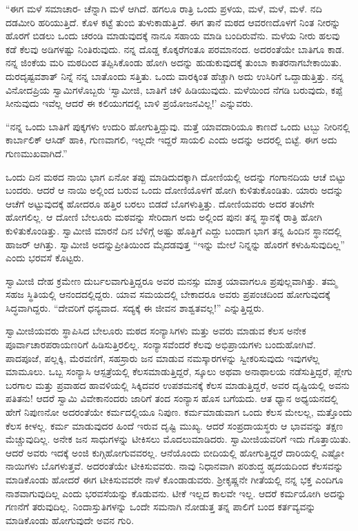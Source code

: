 \vskip 2pt

 “ಈಗ ಮಳೆ ಸಮಾಚಾರ- ಚೆನ್ನಾಗಿ ಮಳೆ ಆಗಿದೆ. ಹಗಲೂ ರಾತ್ರಿ ಒಂದು ಪ್ರಳಯ, ಮಳೆ, ಮಳೆ, ಮಳೆ. ನದಿ ದಡಮೀರಿ ಹರಿಯುತ್ತಿದೆ. ಕೊಳ ಕಟ್ಟೆ ತುಂಬಿ ತುಳುಕಾಡುತ್ತಿದೆ. ಈಗ ತಾನೆ ಮಠದ ಆವರಣದೊಳಗೆ ನಿಂತ ನೀರನ್ನು ಹೊರಗೆ ಬಿಡಲು ಒಂದು ಚರಂಡಿ ಮಾಡುವುದಕ್ಕೆ ನಾನೂ ಸಹಾಯ ಮಾಡಿ ಬಂದಿರುವೆನು. ಮಳೆಯ ನೀರು ಹಲವು ಕಡೆ ಕೆಲವು ಅಡಿಗಳಷ್ಟು ನಿಂತಿರುವುದು. ನನ್ನ ದೊಡ್ಡ ಕೊಕ್ಕರೆಗಂತೂ ಪರಮಾನಂದ. ಅದರಂತೆಯೇ ಬಾತಿಗೂ ಕಾಡ. ನನ್ನ ಜಿಂಕೆಯ ಮರಿ ಮಠದಿಂದ ತಪ್ಪಿಸಿಕೊಂಡು ಹೋಗಿ ಅದನ್ನು ಹುಡುಕುವುದಕ್ಕೆ ತುಂಬಾ ಕಾತರನಾಗಬೇಕಾಯಿತು. ದುರದೃಷ್ಟವಶಾತ್ ನಿನ್ನೆ ನನ್ನ ಬಾತೊಂದು ಸತ್ತಿತು. ಒಂದು ವಾರಕ್ಕಿಂತ ಹೆಚ್ಚಾಗಿ ಅದು ಉಸಿರಿಗೆ ಒದ್ದಾಡುತ್ತಿತ್ತು. ನನ್ನ ವಿನೋದಪ್ರಿಯ ಸ್ವಾಮಿಗಳೊಬ್ಬರು ‘ಸ್ವಾಮೀಜಿ, ಬಾತಿಗೆ ಚಳಿ ಹಿಡಿಯುವುದು. ಮಳೆಯಿಂದ ನೆಗಡಿ ಬರುವುದು, ಕಪ್ಪೆ ಸೀನುವುದು ಇವೆಲ್ಲ ಆದರೆ ಈ ಕಲಿಯುಗದಲ್ಲಿ ಬಾಳಿ ಪ್ರಯೋಜನವಿಲ್ಲ!’ ಎನ್ನುವರು.

 “ನನ್ನ ಒಂದು ಬಾತಿಗೆ ಪುಕ್ಕಗಳು ಉದುರಿ ಹೋಗುತ್ತಿದ್ದುವು. ಮತ್ತೆ ಯಾವದಾರಿಯೂ ಕಾಣದೆ ಒಂದು ಟಬ್ಬು ನೀರಿನಲ್ಲಿ ಕಾರ್ಬಾಲಿಕ್ ಆಸಿಡ್ ಹಾಕಿ, ಗುಣವಾಗಲಿ, ಇಲ್ಲದೇ ಇದ್ದರೆ ಸಾಯಲಿ ಎಂದು ಅದನ್ನು ಅದರಲ್ಲಿ ಬಿಟ್ಟೆ. ಈಗ ಅದು ಗುಣಮುಖವಾಗಿದೆ.”

 ಒಂದು ದಿನ ಮಠದ ನಾಯಿ ಭಾಗ ಏನೋ ತಪ್ಪು ಮಾಡಿದುದಕ್ಕಾಗಿ ದೋಣಿಯಲ್ಲಿ ಅದನ್ನು ಗಂಗಾನದಿಯ ಆಚೆ ಬಿಟ್ಟು ಬಂದರು. ಆದರೆ ಆ ನಾಯಿ ಅಲ್ಲಿಂದ ಬರುವ ಒಂದು ದೋಣಿಯೊಳಗೆ ಹೋಗಿ ಕುಳಿತುಕೊಂಡಿತು. ಯಾರು ಅದನ್ನು ಆಚೆಗೆ ಅಟ್ಟುವುದಕ್ಕೆ ಹೋದರೂ ಹತ್ತಿರ ಬರಲು ಬಿಡದೆ ಬೊಗಳುತ್ತಿತ್ತು. ದೋಣಿಯವರು ಅದರ ತಂಟೆಗೇ ಹೋಗಲಿಲ್ಲ. ಆ ದೋಣಿ ಬೇಲೂರು ಮಠವನ್ನು ಸೇರಿದಾಗ ಅದು ಅಲ್ಲಿಂದ ಪುನಃ ತನ್ನ ಸ್ಥಾನಕ್ಕೆ ರಾತ್ರಿ ಹೋಗಿ ಕುಳಿತುಕೊಂಡಿತ್ತು. ಸ್ವಾಮೀಜಿ ಮಾರನೆ ದಿನ ಬೆಳಿಗ್ಗೆ ಅಷ್ಟು ಹೊತ್ತಿಗೆ ಎದ್ದು ಬಂದಾಗ ಭಾಗ ತನ್ನ ಹಿಂದಿನ ಸ್ಥಾನದಲ್ಲಿ ಹಾಜರ್ ಆಗಿತ್ತು. ಸ್ವಾಮೀಜಿ ಅದನ್ನು\break ಪ್ರೀತಿಯಿಂದ ಮೈದಡವುತ್ತ “ಇನ್ನು ಮೇಲೆ ನಿನ್ನನ್ನು ಹೊರಗೆ ಕಳುಹಿಸುವುದಿಲ್ಲ” ಎಂದು ಭರವಸೆ ಕೊಟ್ಟರು. 

 ಸ್ವಾಮೀಜಿ ದೇಹ ಕ್ರಮೇಣ ದುರ್ಬಲವಾಗುತ್ತಿದ್ದರೂ ಅವರ ಮನಸ್ಸು ಮಾತ್ರ ಯಾವಾಗಲೂ ಪ್ರಪುಲ್ಲವಾಗಿತ್ತು. ತಮ್ಮ ಸಹಜ ಸ್ಥಿತಿಯಲ್ಲಿ ಆನಂದದಲ್ಲಿದ್ದರು. ಯಾವ ಸಮಯದಲ್ಲಿ ಬೇಕಾದರೂ ಅವರು ಪ್ರಪಂಚದಿಂದ ಹೋಗುವುದಕ್ಕೆ ಸಿದ್ಧವಾಗಿದ್ದರು. “ದೇವರಿಗೆ ಧನ್ಯವಾದ. ಸದ್ಯಕ್ಕೆ ಈ ಜೀವನ ಶಾಶ್ವತವಲ್ಲ!” ಎನ್ನುತ್ತಿದ್ದರು. 

 ಸ್ವಾಮೀಜಿಯವರು ಸ್ಥಾಪಿಸಿದ ಬೇಲೂರು ಮಠದ ಸಂನ್ಯಾಸಿಗಳು ಮತ್ತು ಅವರು ಮಾಡುವ ಕೆಲಸ ಅನೇಕ ಪೂರ್ವಾಚಾರಪರಾಯಣರಿಗೆ ಹಿಡಿಸುತ್ತಿರಲಿಲ್ಲ. ಸಂನ್ಯಾಸವೆಂದರೆ ಕೆಲವು ಅಭಿಪ್ರಾಯಗಳು ಬಂದುಹೋಗಿವೆ. ಪಾದಪೂಜೆ, ಪಲ್ಲಕ್ಕಿ, ಮೆರವಣಿಗೆ, ಸಹಸ್ರಾರು ಜನ ಮಾಡುವ ನಮಸ್ಕಾರಗಳನ್ನು ಸ್ವೀಕರಿಸುವುದು ಇವುಗಳೆಲ್ಲ ಮಾಮೂಲು. ಒಬ್ಬ ಸಂನ್ಯಾಸಿ ಆಸ್ಪತ್ರೆಯಲ್ಲಿ ಕೆಲಸಮಾಡುತ್ತಿದ್ದರೆ, ಸ್ಕೂಲು ಅಥವಾ ಅನಾಥಾಲಯ ನಡೆಸುತ್ತಿದ್ದರೆ, ಪ್ಲೇಗು ಬರಗಾಲ ಮತ್ತು ಪ್ರವಾಹದ ಹಾವಳಿಯಲ್ಲಿ ಸಿಕ್ಕಿದವರ ಉಪಶಮನಕ್ಕೆ ಕೆಲಸ ಮಾಡುತ್ತಿದ್ದರೆ, ಅವರ ದೃಷ್ಟಿಯಲ್ಲಿ ಅವನು ಪತಿತನು! ಆದರೆ ಸ್ವಾಮಿ ವಿವೇಕಾನಂದರು ಜಾರಿಗೆ ತಂದ ಸಂನ್ಯಾಸ ಹೊಸ ಬಗೆಯದು. ಆತ ಧ್ಯಾನ ಅಧ್ಯಯನದಲ್ಲಿ ಹೇಗೆ ನಿಪುಣನೋ ಅದರಂತೆಯೇ ಕರ್ಮದಲ್ಲಿಯೂ ನಿಪುಣ. ಕರ್ಮಮಾಡುವಾಗ ಒಂದು ಕೆಲಸ ಮೇಲಲ್ಲ, ಮತ್ತೊಂದು ಕೆಲಸ ಕೀಳಲ್ಲ. ಕರ್ಮ ಮಾಡುವುದರ ಹಿಂದೆ ಇರುವ ದೃಷ್ಟಿ ಮುಖ್ಯ. ಆದರೆ ಸಂಪ್ರದಾಯಸ್ಥರು ಆ ಭಾವವನ್ನು ತಕ್ಷಣ ಮೆಚ್ಚುವುದಿಲ್ಲ. ಅನೇಕ ಜನ ಸಾಧುಗಳನ್ನು ಟೀಕಿಸಲು ಮೊದಲುಮಾಡಿದರು. ಸ್ವಾಮೀಜಿಯವರಿಗೆ ಇದು ಗೊತ್ತಾಯಿತು. ಆದರೆ ಅವರು ಇದಕ್ಕೆ ಅಂಜಿ ಕುಗ್ಗಿಹೋಗುವವರಲ್ಲ. ಆನೆಯೊಂದು ಬೀದಿಯಲ್ಲಿ ಹೋಗುತ್ತಿದ್ದರೆ ದಾರಿಯಲ್ಲಿ ಎಷ್ಟೋ ನಾಯಿಗಳು ಬೊಗಳುತ್ತವೆ. ಅದರಂತೆಯೇ ಟೀಕಿಸುವವರು. ನಾವು ನಿಧಾನವಾಗಿ ಪರಿಶುದ್ಧ ಹೃದಯದಿಂದ ಕೆಲಸವನ್ನು ಮಾಡಿಕೊಂಡು ಹೋದರೆ ಈಗ ಟೀಕಿಸುವವರೇ ನಾಳೆ ಕೊಂಡಾಡುವರು. ಶ‍್ರೀಕೃಷ್ಣನೇ ಗೀತೆಯಲ್ಲಿ ನನ್ನ ಭಕ್ತ ಎಂದಿಗೂ ನಾಶವಾಗುವುದಿಲ್ಲ ಎಂದು ಭರವಸೆಯನ್ನು ಕೊಡುವನು. ಟೀಕೆ ಇಲ್ಲದ ಕಾಲವೇ ಇಲ್ಲ. ಆದರೆ ಕರ್ಮಯೋಗಿ ಅದನ್ನು ಗಣನೆಗೆ ತರುವುದಿಲ್ಲ. ನಿಂದಾಸ್ತುತಿಗಳನ್ನು ಒಂದೇ ಸಮನಾಗಿ ನೋಡುತ್ತ ತನ್ನ ಪಾಲಿಗೆ ಬಂದ ಕರ್ತವ್ಯವನ್ನು ಮಾಡಿಕೊಂಡು ಹೋಗುವುದೇ ಅವನ ಗುರಿ. 

